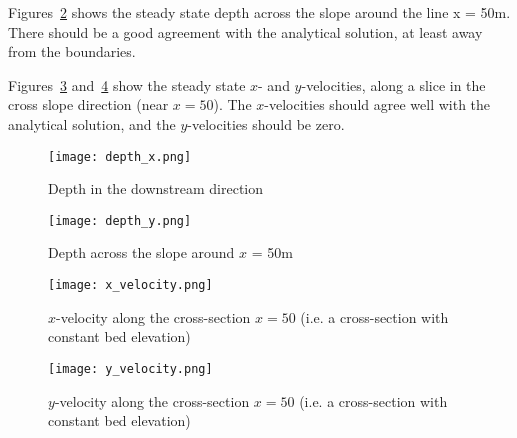 Figures~\ref{fig:depthacrosschan} shows the steady state depth across the slope around the line x = 50m. 
There should be a good agreement with the analytical solution, at least away from the boundaries. 

Figures~\ref{fig:xvelscrosschan} and~\ref{fig:yvelscroschan} show the steady state $x$- and $y$-velocities, along a slice in the cross slope direction (near $x=50$). The $x$-velocities should agree well with the analytical solution, and the $y$-velocities should be zero. 

\begin{figure}
\begin{center}
\texttt{[image: depth\_x.png]}
\caption{Depth in the downstream direction}
\label{fig:depthdownchan}
\end{center}
\end{figure}
 
\begin{figure}
\begin{center}
\texttt{[image: depth\_y.png]}
\caption{Depth across the slope around $x$ = 50m}
\label{fig:depthacrosschan}
\end{center}
\end{figure}

\begin{figure}
\begin{center}
\texttt{[image: x\_velocity.png]}
\caption{$x$-velocity along the cross-section $x=50$ (i.e. a cross-section with constant bed elevation)}
\label{fig:xvelscrosschan}
\end{center}
\end{figure}

\begin{figure}
\begin{center}
\texttt{[image: y\_velocity.png]}
\caption{$y$-velocity along the cross-section $x=50$ (i.e. a cross-section with constant bed elevation)}
\label{fig:yvelscroschan}
\end{center}
\end{figure}


\endinput
